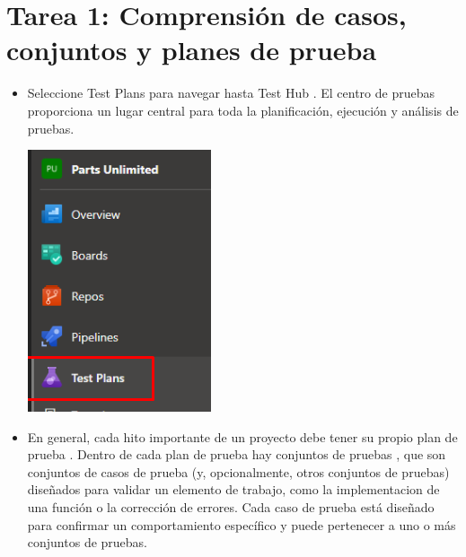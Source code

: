 \section{Tarea 1: Comprensión de casos, conjuntos y planes de prueba} 
\begin{itemize}
 \item  Seleccione Test Plans para navegar hasta Test Hub . El centro de pruebas proporciona un lugar central para toda la planificación, ejecución y análisis de pruebas.
\begin{center}
\includegraphics[width=\columnwidth]{images/40}\newline
\end{center}
 \item  En general, cada hito importante de un proyecto debe tener su propio plan de prueba . Dentro de cada plan de prueba hay conjuntos de pruebas , que son conjuntos de casos de prueba (y, opcionalmente, otros conjuntos de pruebas) diseñados para validar un elemento de trabajo, como la implementacion de una función o la corrección de errores. Cada caso de prueba está diseñado para confirmar un comportamiento específico y puede pertenecer a uno o más conjuntos de pruebas. 


\end{itemize}

